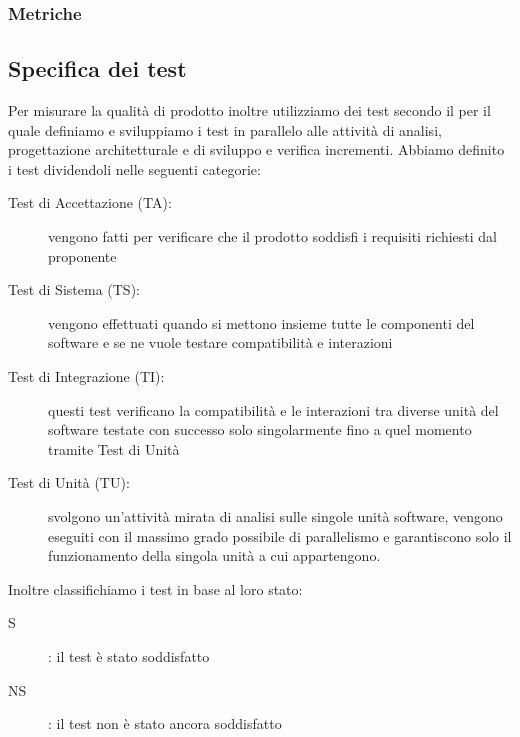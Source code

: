 \documentclass[../piano-di-qualifica.tex]{subfiles}
\begin{document}
\subsubsection{Metriche}%
\label{subs:metriche}


\subsection{Specifica dei test}%
\label{sub:test}
    Per misurare la qualità di prodotto inoltre utilizziamo dei test secondo il  per il quale definiamo e sviluppiamo i test in parallelo alle attività di analisi, progettazione architetturale e di sviluppo e verifica incrementi.
    Abbiamo definito i test dividendoli nelle seguenti categorie:
    \begin{description}
      \item [Test di Accettazione (TA):] vengono fatti per verificare che il prodotto soddisfi i requisiti richiesti dal proponente
      \item [Test di Sistema (TS):] vengono effettuati quando si mettono insieme tutte le componenti del software e se ne vuole testare compatibilità e interazioni
      \item [Test di Integrazione (TI):] questi test verificano la compatibilità e le interazioni tra diverse unità del software testate con successo solo singolarmente fino a quel momento tramite Test di Unità
      \item [Test di Unità (TU):] svolgono un'attività mirata di analisi sulle singole unità software, vengono eseguiti con il massimo grado possibile di parallelismo e garantiscono solo il funzionamento della singola unità a cui appartengono.
    \end{description}
    Inoltre classifichiamo i test in base al loro stato:
      \begin{description}
        \item [S]: il test è stato soddisfatto
        \item [NS]: il test non è stato ancora soddisfatto
      \end{description}
\end{document}
